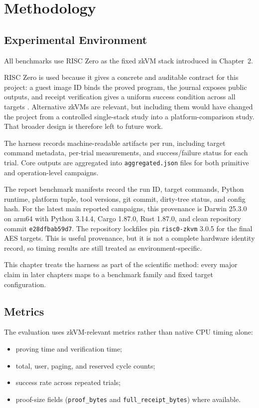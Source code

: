 \chapter{Methodology}

\section{Experimental Environment}

All benchmarks use RISC Zero as the fixed zkVM stack introduced in Chapter~2.

RISC Zero is used because it gives a concrete and auditable contract for this
project: a guest image ID binds the proved program, the journal exposes public
outputs, and receipt verification gives a uniform success condition across all
targets \cite{risczeroDocs}. Alternative zkVMs are relevant, but including them
would have changed the project from a controlled single-stack study into a
platform-comparison study. That broader design is therefore left to future work.

The harness records machine-readable artifacts per run, including target command
metadata, per-trial measurements, and success/failure status for each trial.
Core outputs are aggregated into \texttt{aggregated.json} files for both
primitive and operation-level campaigns.

The report benchmark manifests record the run ID, target commands, Python
runtime, platform tuple, tool versions, git commit, dirty-tree status, and config
hash. For the latest main reported campaigns, this provenance is Darwin 25.3.0 on
arm64 with Python 3.14.4, Cargo 1.87.0, Rust 1.87.0, and clean repository commit
\texttt{e28dfbab59d7}. The repository lockfiles pin \texttt{risc0-zkvm} 3.0.5 for
the final AES targets. This is useful provenance, but it is not a complete
hardware identity record, so timing results are still treated as
environment-specific.

This chapter treats the harness as part of the scientific method: every major
claim in later chapters maps to a benchmark family and fixed target
configuration.

\section{Metrics}

The evaluation uses zkVM-relevant metrics rather than native CPU timing alone:

\begin{itemize}
\item proving time and verification time;
\item total, user, paging, and reserved cycle counts;
\item success rate across repeated trials;
\item proof-size fields (\texttt{proof\_bytes} and
\texttt{full\_receipt\_bytes}) where available.
\end{itemize}

